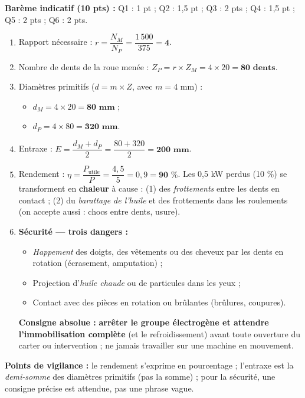 \documentclass[11pt]{article}
\begin{document}
\begin{corrige}
\textbf{Barème indicatif (10 pts) :} Q1 : 1 pt ; Q2 : 1,5 pt ; Q3 : 2 pts ; Q4 : 1,5 pt ; Q5 : 2 pts ; Q6 : 2 pts.

\begin{enumerate}
    \item Rapport nécessaire : $r = \dfrac{N_M}{N_P} = \dfrac{1\,500}{375} = \textbf{4}$.
    \item Nombre de dents de la roue menée : $Z_P = r \times Z_M = 4 \times 20 = \textbf{80 dents}$.
    \item Diamètres primitifs ($d = m \times Z$, avec $m = 4$ mm) :
    \begin{itemize}
        \item $d_M = 4 \times 20 = \textbf{80 mm}$ ;
        \item $d_P = 4 \times 80 = \textbf{320 mm}$.
    \end{itemize}
    \item Entraxe : $E = \dfrac{d_M + d_P}{2} = \dfrac{80 + 320}{2} = \textbf{200 mm}$.
    \item Rendement : $\eta = \dfrac{P_{\text{utile}}}{P} = \dfrac{4,5}{5} = 0,9 = \textbf{90 \%}$. Les 0,5 kW perdus (10 \%) se transforment en \textbf{chaleur} à cause : (1) des \emph{frottements} entre les dents en contact ; (2) du \emph{barattage de l'huile} et des frottements dans les roulements (on accepte aussi : chocs entre dents, usure).
    \item \textbf{Sécurité — trois dangers :}
    \begin{itemize}
        \item \emph{Happement} des doigts, des vêtements ou des cheveux par les dents en rotation (écrasement, amputation) ;
        \item Projection d'\emph{huile chaude} ou de particules dans les yeux ;
        \item Contact avec des pièces en rotation ou brûlantes (brûlures, coupures).
    \end{itemize}
    \textbf{Consigne absolue :} \textbf{arrêter le groupe électrogène et attendre l'immobilisation complète} (et le refroidissement) avant toute ouverture du carter ou intervention ; ne jamais travailler sur une machine en mouvement.
\end{enumerate}
\textbf{Points de vigilance :} le rendement s'exprime en pourcentage ; l'entraxe est la \emph{demi-somme} des diamètres primitifs (pas la somme) ; pour la sécurité, une consigne précise est attendue, pas une phrase vague.
\end{corrige}
\end{document}
